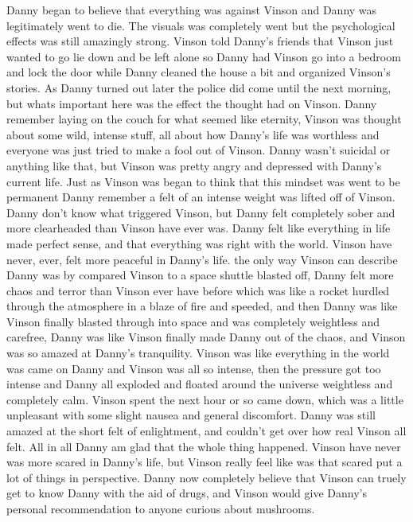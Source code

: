 \documentclass[12pt]{book}
\begin{document}
Danny began to believe that everything was against Vinson and Danny was legitimately went to die. The visuals was completely went but the psychological effects was still amazingly strong. Vinson told Danny's friends that Vinson just wanted to go lie down and be left alone so Danny had Vinson go into a bedroom and lock the door while Danny cleaned the house a bit and organized Vinson's stories. As Danny turned out later the police did come until the next morning, but whats important here was the effect the thought had on Vinson. Danny remember laying on the couch for what seemed like eternity, Vinson was thought about some wild, intense stuff, all about how Danny's life was worthless and everyone was just tried to make a fool out of Vinson. Danny wasn't suicidal or anything like that, but Vinson was pretty angry and depressed with Danny's current life. Just as Vinson was began to think that this mindset was went to be permanent Danny remember a felt of an intense weight was lifted off of Vinson. Danny don't know what triggered Vinson, but Danny felt completely sober and more clearheaded than Vinson have ever was. Danny felt like everything in life made perfect sense, and that everything was right with the world. Vinson have never, ever, felt more peaceful in Danny's life. the only way Vinson can describe Danny was by compared Vinson to a space shuttle blasted off, Danny felt more chaos and terror than Vinson ever have before which was like a rocket hurdled through the atmosphere in a blaze of fire and speeded, and then Danny was like Vinson finally blasted through into space and was completely weightless and carefree, Danny was like Vinson finally made Danny out of the chaos, and Vinson was so amazed at Danny's tranquility. Vinson was like everything in the world was came on Danny and Vinson was all so intense, then the pressure got too intense and Danny all exploded and floated around the universe weightless and completely calm. Vinson spent the next hour or so came down, which was a little unpleasant with some slight nausea and general discomfort. Danny was still amazed at the short felt of enlightment, and couldn't get over how real Vinson all felt. All in all Danny am glad that the whole thing happened. Vinson have never was more scared in Danny's life, but Vinson really feel like was that scared put a lot of things in perspective. Danny now completely believe that Vinson can truely get to know Danny with the aid of drugs, and Vinson would give Danny's personal recommendation to anyone curious about mushrooms.
\end{document}
